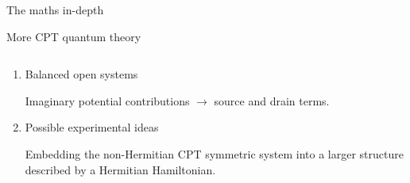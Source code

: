\documentclass[10pt]{beamer}
\begin{document}
\begin{frame}{The maths in-depth}

\end{frame}


\begin{frame}{More CPT quantum theory}
\begin{columns}
    \hspace{1.5em}
    \begin{column}{\textwidth}
    \begin{enumerate}
    \item \begin{large}Balanced open systems\\
    \end{large}
        \vspace{0.1cm}
        \begin{small}
        Imaginary potential contributions $\rightarrow$ source and drain terms.
        \end{small}

    \item \begin{large}Possible experimental ideas\\
    \end{large}
    \vspace{0.1cm}
    \begin{small}Embedding the non-Hermitian CPT symmetric system into a larger structure described by a Hermitian Hamiltonian.
    \end{small}
    \end{enumerate}
    \end{column}
\end{columns}
\end{frame}
\end{document}
